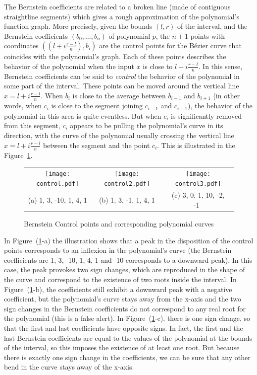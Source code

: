 \documentclass{mscs}
\begin{document}
\label{sec:geometrybernstein}
The Bernstein coefficients are related to a broken line (made of
contiguous straightline segments) which gives a rough approximation of the
polynomial's function graph.  More precisely, given the bounds \((l,r)\)
of the interval, and the Bernstein coefficients \((b_0,\ldots, b_n)\)
of polynomial $p$, the $n+1$ points with coordinates \(((l + i
\frac{r-l}{n}), b_i)\) are the control points for the B\'ezier curve
that coincides with the polynomial's graph. Each of these points describes
the behavior of the polynomial when the input \(x\) is close to
\(l+i\frac{r-l}{n}\). In this sense, Bernstein coefficients can be said to
{\em control} the behavior of the polynomial in some part of the interval.
These points can
be moved around the vertical line \(x=l + i\frac{r-l}{n}\).  When \(b_i\) is
close to the average between \(b_{i-1}\) and \(b_{i+1}\) (in other words, when
\(c_i\) is close to the segment joining \(c_{i-1}\) and \(c_{i+1}\)), the
behavior of the polynomial in this area is quite eventless.  But when \(c_i\)
is significantly removed from this segment, \(c_i\) appears to be pulling the
polynomial's curve in its direction, with the curve of the polynomial usually
crossing the vertical line \(x=l+i\frac{r-l}{n}\) between the segment and
the point \(c_i\).  This is illustrated in the Figure~\ref{control}.
\begin{figure}
\begin{center}
\begin{tabular}{ccc}
\texttt{[image: control.pdf]}&
\texttt{[image: control2.pdf]}&
\texttt{[image: control3.pdf]}\\
(a) 1, 3, -10, 1, 4, 1 & (b) 1, 3, -1, 1, 4, 1 & (c) 3, 0, 1, 10, -2, -1\
\end{tabular}
\end{center}
\caption{\label{control} Bernstein Control points and corresponding polynomial curves}
\end{figure}

In Figure~{(\ref{control}-a)} the illustration shows that a peak in
the disposition of the control points corresponds to an inflexion in the
polynomial's curve (the Bernstein coefficients are 1, 3, -10, 1, 4, 1
and -10 corresponds to a downward peak).  In this case, the peak
provokes two sign changes, which are reproduced in the shape of the
curve and correspond to the existence of two roots inside the
interval.  In Figure~(\ref{control}-b), the coefficients still exhibit
a downward peak with a negative coefficient, but the polynomial's
curve stays away from the x-axis and the two sign changes in the
Bernstein coefficients do not correspond to any real root for the
polynomial (this is a false alert).  In Figure~(\ref{control}-c),
there is one sign change, so that the first and last coefficients have
opposite signs.  In fact, the first and the last Bernstein
coefficients are equal to the values of the polynomial at the bounds
of the interval, so this imposes the existence of at least one root.
But because there is exactly one sign change in the coefficients, we
can be sure that any other bend in the curve stays away of the x-axis.
\end{document}
